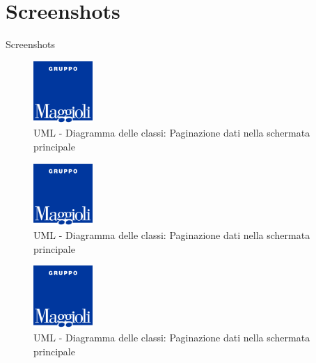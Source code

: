 \documentclass[10pt]{beamer}
\begin{document}
\section{Screenshots}
    \begin{frame}{Screenshots}
    \begin{multicols}{3}
        \begin{figure}[H]
        \includegraphics[width=0.2\textwidth]{maggioli.png}
        \caption{UML - Diagramma delle classi: Paginazione dati nella schermata principale}
        \label{paging}
        \end{figure}
                \begin{figure}[H]
        \includegraphics[width=0.2\textwidth]{maggioli.png}
        \caption{UML - Diagramma delle classi: Paginazione dati nella schermata principale}
        \label{paging}
        \end{figure}
                        \begin{figure}[H]
        \includegraphics[width=0.2\textwidth]{maggioli.png}
        \caption{UML - Diagramma delle classi: Paginazione dati nella schermata principale}
        \label{paging}
        \end{figure}
        \end{multicols}
    \end{frame}
\end{document}
